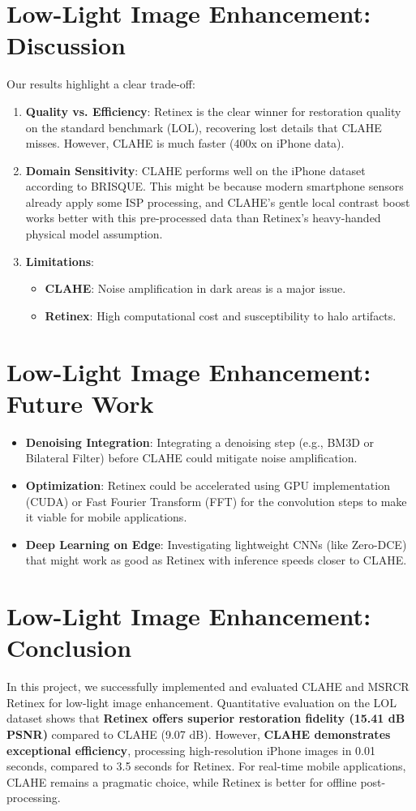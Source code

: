 \section{Low-Light Image Enhancement: Discussion}
Our results highlight a clear trade-off:
\begin{enumerate}
    \item \textbf{Quality vs. Efficiency}: Retinex is the clear winner for restoration quality on the standard benchmark (LOL), recovering lost details that CLAHE misses. However, CLAHE is much faster (400x on iPhone data).
    \item \textbf{Domain Sensitivity}: CLAHE performs well on the iPhone dataset according to BRISQUE. This might be because modern smartphone sensors already apply some ISP processing, and CLAHE's gentle local contrast boost works better with this pre-processed data than Retinex's heavy-handed physical model assumption.
    \item \textbf{Limitations}:
    \begin{itemize}
        \item \textbf{CLAHE}: Noise amplification in dark areas is a major issue.
        \item \textbf{Retinex}: High computational cost and susceptibility to halo artifacts.
    \end{itemize}
\end{enumerate}

\section{Low-Light Image Enhancement: Future Work}
\begin{itemize}
    \item \textbf{Denoising Integration}: Integrating a denoising step (e.g., BM3D or Bilateral Filter) before CLAHE could mitigate noise amplification.
    \item \textbf{Optimization}: Retinex could be accelerated using GPU implementation (CUDA) or Fast Fourier Transform (FFT) for the convolution steps to make it viable for mobile applications.
    \item \textbf{Deep Learning on Edge}: Investigating lightweight CNNs (like Zero-DCE) that might work as good as Retinex with inference speeds closer to CLAHE.
\end{itemize}

\section{Low-Light Image Enhancement: Conclusion}
In this project, we successfully implemented and evaluated CLAHE and MSRCR Retinex for low-light image enhancement. Quantitative evaluation on the LOL dataset shows that \textbf{Retinex offers superior restoration fidelity (15.41 dB PSNR)} compared to CLAHE (9.07 dB). However, \textbf{CLAHE demonstrates exceptional efficiency}, processing high-resolution iPhone images in 0.01 seconds, compared to 3.5 seconds for Retinex. For real-time mobile applications, CLAHE remains a pragmatic choice, while Retinex is better for offline post-processing.
